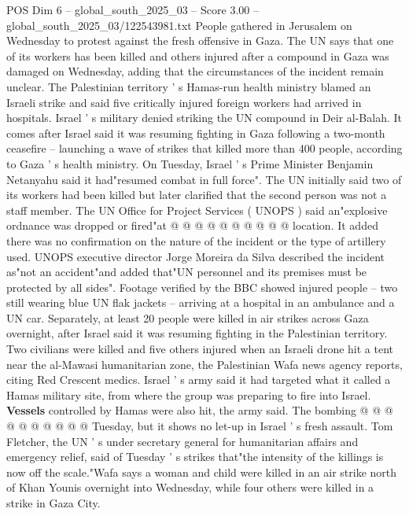 \begin{textsample}{POS Dim 6 – global\_south\_2025\_03 – Score 3.00 – global\_south\_2025\_03/122543981.txt}  \label{ex:f6_pos_319}
People gathered in Jerusalem on Wednesday to protest against the fresh offensive in Gaza.
The UN says that one of its workers has been killed and others injured after a compound in Gaza was damaged on Wednesday, adding that the circumstances of the incident remain unclear.
The Palestinian territory ' s Hamas-run health ministry blamed an Israeli strike and said five critically injured foreign workers had arrived in hospitals.
Israel ' s military denied striking the UN compound in Deir al-Balah.
It comes after Israel said it was resuming fighting in Gaza following a two-month ceasefire -- launching a wave of strikes that killed more than 400 people, according to Gaza ' s health ministry.
On Tuesday, Israel ' s Prime Minister Benjamin Netanyahu said it had"resumed combat in full force".
The UN initially said two of its workers had been killed but later clarified that the second person was not a staff member.
The UN Office for Project Services ( UNOPS ) said an"explosive ordnance was dropped or fired"at @ @ @ @ @ @ @ @ @ @ location.
It added there was no confirmation on the nature of the incident or the type of artillery used.
UNOPS executive director Jorge Moreira da Silva described the incident as"not an accident"and added that"UN personnel and its premises must be protected by all sides".
Footage verified by the BBC showed injured people -- two still wearing blue UN flak jackets -- arriving at a hospital in an ambulance and a UN car.
Separately, at least 20 people were killed in air strikes across Gaza overnight, after Israel said it was resuming fighting in the Palestinian territory.
Two civilians were killed and five others injured when an Israeli drone hit a tent near the al-Mawasi humanitarian zone, the Palestinian Wafa news agency reports, citing Red Crescent medics.
Israel ' s army said it had targeted what it called a Hamas military site, from where the group was preparing to fire into Israel. \textbf{Vessels} controlled by Hamas were also hit, the army said.
The bombing @ @ @ @ @ @ @ @ @ @ Tuesday, but it shows no let-up in Israel ' s fresh assault.
Tom Fletcher, the UN ' s under secretary general for humanitarian affairs and emergency relief, said of Tuesday ' s strikes that"the intensity of the killings is now off the scale."Wafa says a woman and child were killed in an air strike north of Khan Younis overnight into Wednesday, while four others were killed in a strike in Gaza City.

\end{textsample}
